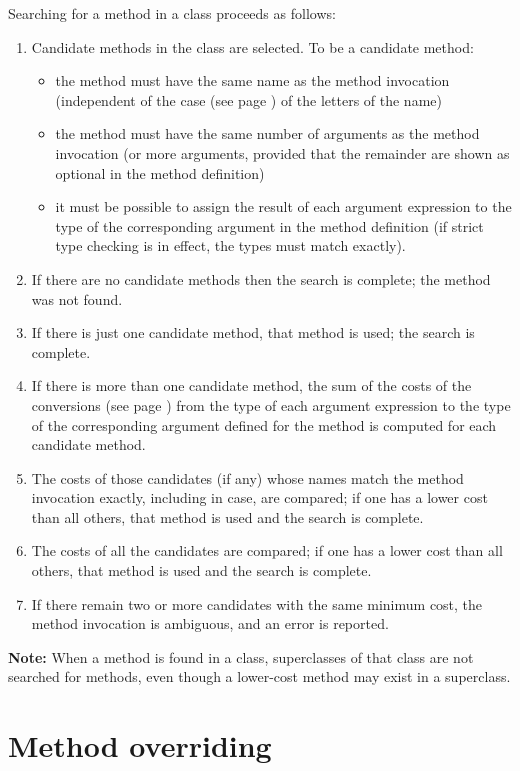 Searching for a method in a class proceeds as follows:
\begin{enumerate}
\item 
Candidate methods in the class are selected.
To be a candidate method:
\begin{itemize}
\item 
the method must have the same name as the method invocation (independent
of the  case (see page \pageref{refcase})  of the letters of the name)
\item 
the method must have the same number of arguments as the method
invocation (or more arguments, provided that the remainder are shown as
optional in the method definition)
\item 
it must be possible to assign the result of each argument expression to
the type of the corresponding argument in the method definition (if
strict type checking is in effect, the types must match exactly).
\end{itemize}
\item 
If there are no candidate methods then the search is complete; the
method was not found.
\item If there is just one candidate method, that method is used; the
search is complete.
\item 
If there is more than one candidate method, the sum of the
 costs of the conversions (see page \pageref{refcosts})  from the type of each
argument expression to the type of the corresponding argument defined
for the method is computed for each candidate method.
\item 
The costs of those candidates (if any) whose names match the method
invocation exactly, including in case, are compared; if one has a lower
cost than all others, that method is used and the search is complete.
\item 
The costs of all the candidates are compared; if one has a lower
cost than all others, that method is used and the search is complete.
\item 
If there remain two or more candidates with the same minimum cost, the
method invocation is ambiguous, and an error is reported.
\end{enumerate}
\textbf{Note: }When a method is found in a class, superclasses of that class are
not searched for methods, even though a lower-cost method may exist in a
superclass.
\section{Method overriding}\label{refoverrid}
 
